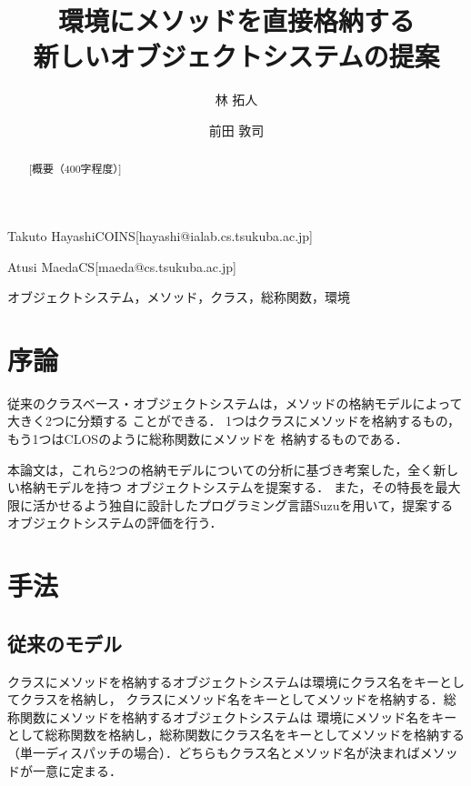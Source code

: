\documentclass{ipsjprosym}
\begin{document}
\title{環境にメソッドを直接格納する \\ 新しいオブジェクトシステムの提案}


\author{林 拓人}{Takuto Hayashi}{COINS}[hayashi@ialab.cs.tsukuba.ac.jp]
\author{前田 敦司}{Atusi Maeda}{CS}[maeda@cs.tsukuba.ac.jp]

\begin{abstract}
[概要（400字程度）]
\end{abstract}

\begin{jkeyword}
オブジェクトシステム，メソッド，クラス，総称関数，環境
\end{jkeyword}

\maketitle

\section{序論}

従来のクラスベース・オブジェクトシステムは，メソッドの格納モデルによって大きく2つに分類する
ことができる．
1つはクラスにメソッドを格納するもの，もう1つはCLOS\cite{CLOS}のように総称関数にメソッドを
格納するものである．

本論文は，これら2つの格納モデルについての分析に基づき考案した，全く新しい格納モデルを持つ
オブジェクトシステムを提案する．
また，その特長を最大限に活かせるよう独自に設計したプログラミング言語Suzuを用いて，提案する
オブジェクトシステムの評価を行う．

\section{手法}

\subsection{従来のモデル}

クラスにメソッドを格納するオブジェクトシステムは環境にクラス名をキーとしてクラスを格納し，
クラスにメソッド名をキーとしてメソッドを格納する．総称関数にメソッドを格納するオブジェクトシステムは
環境にメソッド名をキーとして総称関数を格納し，総称関数にクラス名をキーとしてメソッドを格納する
（単一ディスパッチの場合）．どちらもクラス名とメソッド名が決まればメソッドが一意に定まる．
\end{document}
